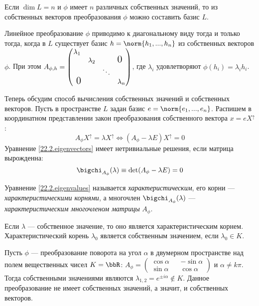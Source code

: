 \begin{cons}
Если $\dim L = n$ и $\phi$ имеет $n$ различных собственных значений, то из собственных векторов преобразования $\phi$ можно составить базис $L$.
\end{cons}  
\begin{stt}
Линейное преобразование $\phi$ приводимо к диагональному виду тогда и только тогда, когда в $L$ существует базис $ h = \norm{h_1,...,h_n}$ из собственных векторов $\phi$. При этом $A_{\phi,h}=
\begin{pmatrix}
\lambda_1 &           &        & \\
        & \lambda_2 &        & \fudge {0 }  \\
        &			& \ddots & \\
\fudge{ 0}&			&		 & \lambda_n \\
\end{pmatrix}$, где $\lambda_i$ удовлетворяют $\phi(h_i)=\lambda_i h_i$.
\end{stt} 

Теперь обсудим способ вычисления собственных значений и собственных векторов. Пусть в пространстве $L$ задан базис $ e=\norm{e_1,...,e_n}$. Распишем в координатном представлении закон преобразования собственного вектора $x=e X^\uparrow$:
\begin{equation}\label{22.2.eigenvectors}
A_\phi X^\uparrow=\lambda X^\uparrow \Leftrightarrow (A_\phi-\lambda E)X^\uparrow=0
\end{equation}
Уравнение \ref{22.2.eigenvectors} имеет нетривиальные решения, если матрица вырожденна:
\begin{equation}\label{22.2.eigenvalues}
\bigchi_{A_\phi}(\lambda)\equiv\det(A_\phi-\lambda E)=0
\end{equation}
\begin{defn}
Уравнение \ref{22.2.eigenvalues} называется \textit{характеристическим}, его корни --- \textit{характеристическими корнями}, а многочлен $\bigchi_{A_\phi}(\lambda)$ --- \textit{характеристическим многочленом матрицы} $A_\phi$.
\end{defn}
\begin{stt}
Если $\lambda$ --- собственное значение, то оно является характеристическим корнем. Характеристический корень $\lambda_0$ является собственным значением, если $\lambda_0 \in K$.
\end{stt}
\begin{exmpl}
Пусть $\phi$ --- преобразование поворота на угол $\alpha$ в двумерном пространстве над полем вещественных чисел $K=\bbR$: $A_\phi=\begin{pmatrix}
\cos\alpha && -\sin\alpha \\ \sin\alpha && \cos\alpha
\end{pmatrix}$ и $\alpha \neq k\pi$. Тогда собственными значениями являются $\lambda_{1,2}=e^{\pm i\alpha} \notin K$. Данное преобразование не имеет собственных значений, а значит, и собственных векторов.
\end{exmpl}

